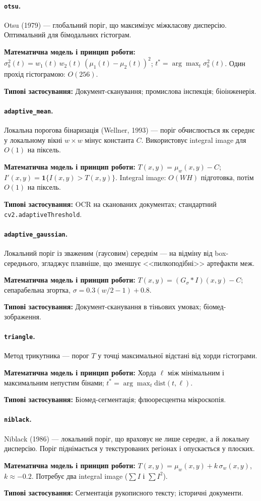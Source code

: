 \documentclass[a4paper,12pt]{article}
\newcommand{\algodesc}[6]{%
	\paragraph{\texttt{#1}.} #2

	\textbf{Математична модель і принцип роботи:} #3

	\textbf{Типові застосування:} #6
	\par\medskip
}
\begin{document}
\algodesc{otsu}
{Otsu (1979) --- глобальний поріг, що максимізує міжкласову дисперсію. Оптимальний для бімодальних гістограм.}
{$\sigma_b^2(t)=w_1(t)\,w_2(t)\,(\mu_1(t)-\mu_2(t))^2$; $t^*=\arg\max_t\sigma_b^2(t)$. Один прохід гістограмою: $O(256)$.}
{Не вимагає ручного налаштування параметрів і має чітке статистичне обґрунтування.}
{Глобальний поріг руйнується при нерівномірному освітленні; погано, коли об'єкт займає малу частку кадру.}
{Документ-сканування; промислова інспекція; біоінженерія.}

\algodesc{adaptive\_mean}
{Локальна порогова бінаризація (Wellner, 1993) --- поріг обчислюється як середнє у локальному вікні $w\times w$ мінус константа $C$. Використовує integral image для $O(1)$ на піксель.}
{$T(x,y)=\mu_w(x,y)-C$; $I'(x,y)=\mathbf{1}\{I(x,y)>T(x,y)\}$. Integral image: $O(WH)$ підготовка, потім $O(1)$ на піксель.}
{Адаптується до локальних змін освітлення і придатний для неоднорідного фону.}
{Не зважує дисперсію --- хибно бінаризує плоскі області; чутливий до $C$ та $w$.}
{OCR на сканованих документах; стандартний \texttt{cv2.adaptiveThreshold}.}

\algodesc{adaptive\_gaussian}
{Локальний поріг із зваженим (гаусовим) середнім --- на відміну від box-середнього, згладжує плавніше, що зменшує <<пилкоподібні>> артефакти меж.}
{$T(x,y)=(G_\sigma*I)(x,y)-C$; сепарабельна згортка, $\sigma=0.3(w/2-1)+0.8$.}
{Формує плавніші межі маски, ніж box-усереднення, завдяки гаусовому зважуванню.}
{Дорожчий за adaptive mean (неможливо integral image); все ще не враховує $\sigma_w$.}
{Документ-сканування в тіньових умовах; біомед-зображення.}

\algodesc{triangle}
{Метод трикутника --- порог \(T\) у точці максимальної відстані від хорди гістограми.}
{
	Хорда \(\ell\) між мінімальним і максимальним непустим бінами; \(t^*=\arg\max_t \mathrm{dist}(t,\ell)\).
}
{Не вимагає bimodal-припущення; стабільний на гістограмах із одним хвостом; параметрів немає.}
{Може давати хибні пороги на близьких до симетричних розподілів.}
{Біомед-сегментація; флюоресцентна мікроскопія.}

\algodesc{niblack}
{Niblack (1986) --- локальний поріг, що враховує не лише середнє, а й локальну дисперсію. Поріг піднімається у текстурованих регіонах і опускається у плоских.}
{$T(x,y)=\mu_w(x,y)+k\,\sigma_w(x,y)$, $k\approx-0.2$. Потребує два integral image ($\sum I$ і $\sum I^2$).}
{Враховує локальну дисперсію та адаптується до текстурованих ділянок.}
{За $\sigma\to0$ поріг наближається до середнього, тому в плоских областях може посилювати шум; параметри $k,w$ потребують добору.}
{Сегментація рукописного тексту; історичні документи.}
\end{document}
